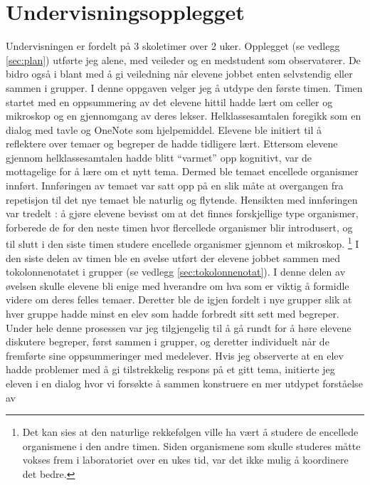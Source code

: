 \documentclass[main.tex]{subfiles}
\begin{document}
\section*{Undervisningsopplegget}
\label{sec:1}
Undervisningen er fordelt på 3 skoletimer over 2 uker. Opplegget (se vedlegg \ref{sec:plan}) 
utførte jeg alene, med veileder og en medstudent som observatører. De bidro også i blant 
med å gi veiledning når elevene jobbet enten selvstendig eller sammen i grupper. I denne 
oppgaven velger jeg å utdype den første timen. 
\newline
\newline
Timen startet med en oppsummering av det elevene hittil hadde lært om celler og mikroskop og en 
gjennomgang av deres lekser. Helklassesamtalen foregikk som en dialog med tavle og OneNote som hjelpemiddel. 
Elevene ble initiert til å reflektere over temaer og begreper de hadde tidligere lært. Ettersom elevene gjennom 
helklassesamtalen hadde blitt ``varmet'' opp kognitivt, var de mottagelige for å lære om et nytt tema. 
Dermed ble temaet encellede organismer innført. Innføringen av temaet var satt opp på en slik 
måte at overgangen fra repetisjon til det nye temaet ble naturlig og flytende. Hensikten med 
innføringen var tredelt : å gjøre elevene bevisst om at det finnes forskjellige type organismer, 
forberede de for den neste timen hvor flercellede organismer blir introdusert, og 
til slutt i den siste timen studere encellede organismer gjennom et mikroskop. \footnote[2]{Det kan sies 
at den naturlige rekkefølgen ville ha vært å studere de encellede organismene i den andre timen. 
Siden organismene som skulle studeres måtte vokses frem i laboratoriet over en ukes tid, var det ikke 
mulig å koordinere det bedre.}
\newline
\newline
I den siste delen av timen ble en øvelse utført der elevene jobbet sammen med tokolonnenotatet i 
grupper (se vedlegg \ref{sec:tokolonnenotat}). I denne delen av øvelsen skulle elevene bli enige med 
hverandre om hva som er viktig å formidle videre om deres felles temaer. Deretter ble de igjen fordelt 
i nye grupper slik at hver gruppe hadde minst en elev som hadde forbredt sitt sett med begreper. 
Under hele denne prosessen var jeg tilgjengelig til å gå rundt for å høre elevene diskutere begreper, 
først sammen i grupper, og deretter individuelt når de fremførte sine oppsummeringer med medelever. 
Hvis jeg observerte at en elev hadde problemer med å gi tilstrekkelig respons på et gitt tema, 
initierte jeg eleven i en dialog hvor vi forsøkte å sammen konstruere en mer utdypet forståelse av 
\end{document}

